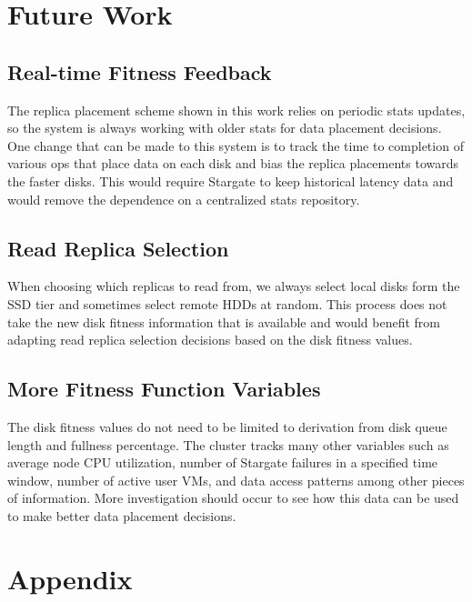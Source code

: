 \documentclass[12pt]{article}
\begin{document}
\section{Future Work}


  \subsection{Real-time Fitness Feedback}

  The replica placement scheme shown in this work relies on periodic stats
  updates, so the system is always working with older stats for data placement
  decisions. One change that can be made to this system is to track the time to
  completion of various ops that place data on each disk and bias the replica
  placements towards the faster disks. This would require Stargate to keep
  historical latency data and would remove the dependence on a centralized
  stats repository.

  \subsection{Read Replica Selection}

  When choosing which replicas to read from, we always select local disks
  form the SSD tier and sometimes select remote HDDs at random. This process
  does not take the new disk fitness information that is available and would
  benefit from adapting read replica selection decisions based on the disk
  fitness values.

  \subsection{More Fitness Function Variables}

  The disk fitness values do not need to be limited to derivation from disk
  queue length and fullness percentage. The cluster tracks many other variables
  such as average node CPU utilization, number of Stargate failures in a
  specified time window, number of active user VMs, and data access patterns
  among other pieces of information. More investigation should occur to see how
  this data can be used to make better data placement decisions.

\section{Appendix}
\end{document}
